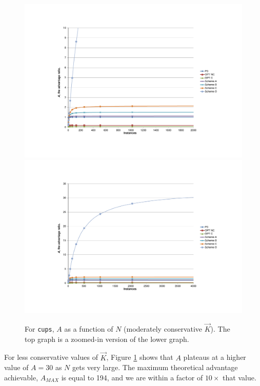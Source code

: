 \begin{figure}
  \centering
  \subfloat%
           {\includegraphics[scale=0.75, trim=5cm 3cm 0cm 4.5cm]{cups-2.pdf} \label{cups2}} \\
  \subfloat%
           {\includegraphics[scale=0.75, trim=5cm 3cm 0cm 3cm]{cups-3.pdf} \label{cups3}} 
  \caption[For \texttt{cups}, $A$ as a function of $N$ (moderately conservative $\vec K$)]%
          {For \texttt{cups}, $A$ as a function of $N$ (moderately conservative $\vec K$).
          The top graph is a zoomed-in version of the lower graph.}
  \label{cups23}
\end{figure}

For less conservative values of $\vec K$, Figure \ref{cups23} shows that $A$
plateaus at a higher value of $A = 30$ as $N$ gets very large. The maximum
theoretical advantage achievable, $A_{MAX}$ is equal to 194, and we 
are within a factor of $10\times$ that value.

